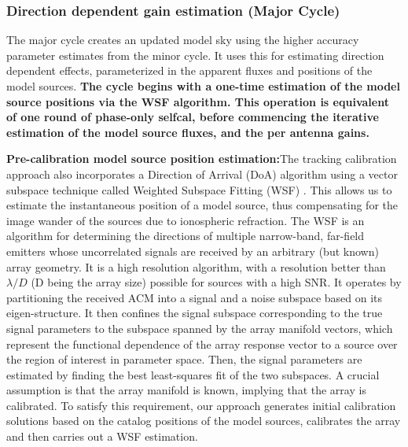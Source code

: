 \documentclass{aa}
\begin{document}
\subsubsection{\label{sub:Direction-dependent-gain}Direction dependent gain estimation (Major Cycle)}  

The major cycle creates an updated model sky using the higher accuracy parameter
estimates from the minor cycle.  It uses this for estimating direction dependent
effects,  parameterized  in the  apparent  fluxes  and  positions of  the  model
sources. \textbf{The cycle begins with a one-time estimation of the model source
  positions via the WSF algorithm.  This operation is equivalent of one round of
  phase-only selfcal,  before commencing the  iterative estimation of  the model
  source fluxes, and the per antenna gains.}


\textbf{Pre-calibration   model   source   position   estimation:}The   tracking
calibration approach  also incorporates a  Direction of Arrival  (DoA) algorithm
using  a  vector  subspace  technique  called Weighted  Subspace  Fitting  (WSF)
\citep{viberg1991detection}.   This  allows  us  to estimate  the  instantaneous
position  of a  model source,  thus  compensating for  the image  wander of  the
sources due to  ionospheric refraction. The WSF is  an algorithm for determining
the directions  of multiple  narrow-band, far-field emitters  whose uncorrelated
signals are  received by an arbitrary (but  known) array geometry. It  is a high
resolution algorithm,  with a  resolution better than  $\lambda/D$ (D  being the
array size)  possible for sources with  a high SNR. It  operates by partitioning
the  received   ACM  into  a   signal  and  a   noise  subspace  based   on  its
eigen-structure.  It then confines the signal subspace corresponding to the true
signal parameters to  the subspace spanned by the  array manifold vectors, which
represent the  functional dependence  of the array  response vector to  a source
over the region of interest in parameter space.  Then, the signal parameters are
estimated by finding the best least-squares  fit of the two subspaces. A crucial
assumption  is that  the array  manifold is  known, implying  that the  array is
calibrated.   To  satisfy  this  requirement,  our  approach  generates  initial
calibration  solutions based  on the  catalog  positions of  the model  sources,
calibrates the array and then carries out a WSF estimation.

\end{document}
